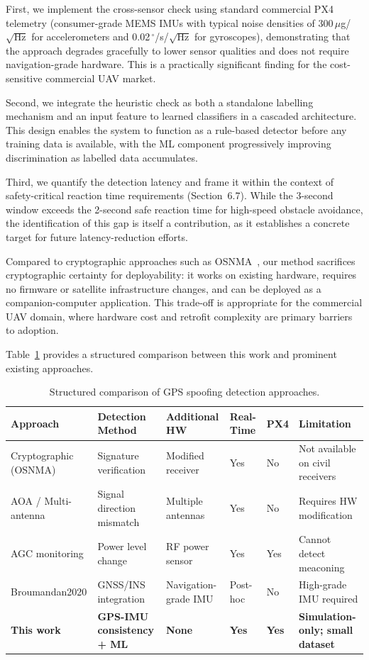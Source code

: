 First, we implement the cross-sensor check using standard commercial PX4 telemetry (consumer-grade MEMS IMUs with typical noise densities of 300\,$\mu$g/$\sqrt{\text{Hz}}$ for accelerometers and 0.02\,$^\circ$/s/$\sqrt{\text{Hz}}$ for gyroscopes), demonstrating that the approach degrades gracefully to lower sensor qualities and does not require navigation-grade hardware. This is a practically significant finding for the cost-sensitive commercial UAV market.

Second, we integrate the heuristic check as both a standalone labelling mechanism and an input feature to learned classifiers in a cascaded architecture. This design enables the system to function as a rule-based detector before any training data is available, with the ML component progressively improving discrimination as labelled data accumulates.

Third, we quantify the detection latency and frame it within the context of safety-critical reaction time requirements (Section~6.7). While the 3-second window exceeds the 2-second safe reaction time for high-speed obstacle avoidance, the identification of this gap is itself a contribution, as it establishes a concrete target for future latency-reduction efforts.

Compared to cryptographic approaches such as OSNMA~\cite{Morales-Ferre2020}, our method sacrifices cryptographic certainty for deployability: it works on existing hardware, requires no firmware or satellite infrastructure changes, and can be deployed as a companion-computer application. This trade-off is appropriate for the commercial UAV domain, where hardware cost and retrofit complexity are primary barriers to adoption.

Table~\ref{tab:comparison_existing} provides a structured comparison between this work and prominent existing approaches.

\begin{table}[H]
\centering
\caption{Structured comparison of GPS spoofing detection approaches.}
\label{tab:comparison_existing}
\small
\begin{tabular}{@{}p{2cm}p{2cm}p{2cm}p{2.5cm}p{2cm}p{1.8cm}@{}}
\toprule
\textbf{Approach} & \textbf{Detection Method} & \textbf{Additional HW} & \textbf{Real-Time} & \textbf{PX4} & \textbf{Limitation} \\
\midrule
Cryptographic (OSNMA) & Signature verification & Modified receiver & Yes & No & Not available on civil receivers \\
AOA / Multi-antenna & Signal direction mismatch & Multiple antennas & Yes & No & Requires HW modification \\
AGC monitoring & Power level change & RF power sensor & Yes & Yes & Cannot detect meaconing \\
Broumandan2020 & GNSS/INS integration & Navigation-grade IMU & Post-hoc & No & High-grade IMU required \\
\textbf{This work} & \textbf{GPS-IMU consistency + ML} & \textbf{None} & \textbf{Yes} & \textbf{Yes} & \textbf{Simulation-only; small dataset} \\
\bottomrule
\end{tabular}
\end{table}

